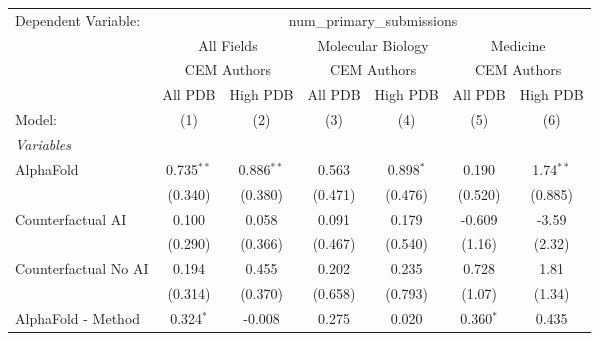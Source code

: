 \begingroup
\centering
\begin{tabular}{lcccccc}
   \tabularnewline \midrule \midrule
   Dependent Variable: & \multicolumn{6}{c}{num\_primary\_submissions}\\
 & \multicolumn{2}{c}{All Fields} & \multicolumn{2}{c}{Molecular Biology} & \multicolumn{2}{c}{Medicine} \\
\cmidrule(lr){2-3} \cmidrule(lr){4-5} \cmidrule(lr){6-7}
 & \multicolumn{2}{c}{CEM Authors} & \multicolumn{2}{c}{CEM Authors} & \multicolumn{2}{c}{CEM Authors} \\
\cmidrule(lr){2-3} \cmidrule(lr){4-5} \cmidrule(lr){6-7}
 & \multicolumn{1}{c}{All PDB} & \multicolumn{1}{c}{High PDB} & \multicolumn{1}{c}{All PDB} & \multicolumn{1}{c}{High PDB} & \multicolumn{1}{c}{All PDB} & \multicolumn{1}{c}{High PDB} \\
\cmidrule(lr){2-2} \cmidrule(lr){3-3} \cmidrule(lr){4-4} \cmidrule(lr){5-5} \cmidrule(lr){6-6} \cmidrule(lr){7-7}
   Model:                                                     & (1)           & (2)           & (3)          & (4)           & (5)         & (6)\\  
   \midrule
   \emph{Variables}\\
   AlphaFold                                                  & 0.735$^{**}$  & 0.886$^{**}$  & 0.563        & 0.898$^{*}$   & 0.190       & 1.74$^{**}$\\   
                                                              & (0.340)       & (0.380)       & (0.471)      & (0.476)       & (0.520)     & (0.885)\\   
   Counterfactual AI                                          & 0.100         & 0.058         & 0.091        & 0.179         & -0.609      & -3.59\\   
                                                              & (0.290)       & (0.366)       & (0.467)      & (0.540)       & (1.16)      & (2.32)\\   
   Counterfactual No AI                                       & 0.194         & 0.455         & 0.202        & 0.235         & 0.728       & 1.81\\   
                                                              & (0.314)       & (0.370)       & (0.658)      & (0.793)       & (1.07)      & (1.34)\\   
   AlphaFold - Method                                         & 0.324$^{*}$   & -0.008        & 0.275        & 0.020         & 0.360$^{*}$ & 0.435\\   

\end{tabular}
